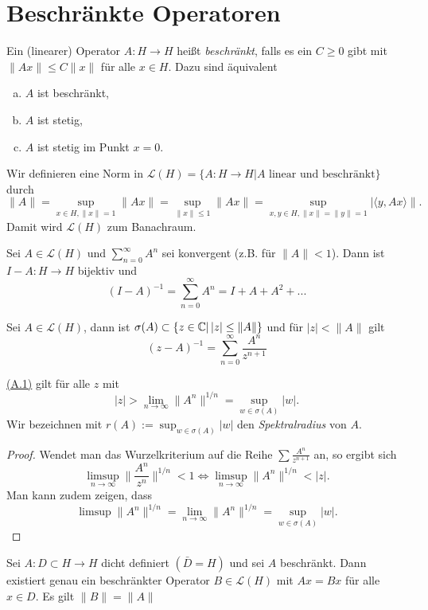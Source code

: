 \documentclass{mycourse}
\renewcommand{\eqref}[1]{\hyperref[#1]{(#1)}}
\begin{document}
\section{Beschränkte Operatoren}
Ein (linearer) Operator $A:H\to H$ heißt \emph{beschränkt}, falls es ein $C\ge 0$ gibt mit $\|Ax\| \le C\|x\|$ für alle $x\in H$. Dazu sind äquivalent
\begin{enumerate}[a)]
\item $A$ ist beschränkt,
\item $A$ ist stetig,
\item $A$ ist stetig im Punkt $x=0$.
\end{enumerate} 
Wir definieren eine Norm in $\mathcal L(H)=\{A: H\to H| A \text{ linear und beschränkt}\}$ durch
\[
\|A\|=\sup_{x\in H, \|x\|=1} \|Ax\|= \sup_{\|x\|\le 1} \|Ax\|=\sup_{x,y\in H, \|x\|=\|y\|=1} |\langle y, Ax\rangle\|.
\]
Damit wird $\mathcal L(H)$ zum Banachraum.
\begin{st}[Neumannreihe]
Sei $A\in \mathcal L(H)$ und 
$\sum_{n=0}^\infty A^n$ sei konvergent (z.B. für $\|A\|<1$). Dann ist $I-A: H\to H$ bijektiv und
\[
(I-A)^{-1}=\sum_{n=0}^\infty A^n=I+A+A^2+...
\]
\end{st}
\begin{st}
Sei $A\in \mathcal L(H)$, dann ist $\sigma(A)\subset \{z\in \mathbb{C} |\, |z|\le \|A\| \}$ und für $|z| < \|A\|$ gilt
\begin{equation}
(z-A)^{-1}=\sum_{n=0}^\infty \frac{A^n}{z^{n+1}} \label{A.1}
\end{equation}
\end{st}
\begin{nt*}
\eqref{A.1} gilt für alle $z$  mit
\[
|z| > \lim_{n\to \infty} \|A^n\|^{1/n}=\sup_{w\in \sigma(A)} |w|.
\]
Wir bezeichnen mit $r(A):= \sup_{w\in \sigma(A)} |w|$ den \emph{Spektralradius} von $A$.
\end{nt*}
\begin{proof}
Wendet man das Wurzelkriterium auf die Reihe $\sum \frac{A^n}{z^{n+1}}$ an, so ergibt sich
\[
\limsup_{n\to \infty} \big \|\frac{A^n}{z^n} \big \|^{1/n} <1 \iff \limsup_{n\to \infty} \|A^n\|^{1/n}< |z|.
\]
Man kann zudem zeigen, dass
\[
\limsup\|A^n\|^{1/n} = \lim_{n\to \infty} \|A^n\|^{1/n}=\sup_{w\in \sigma(A)} |w|.
\]
\end{proof}
\begin{st} \label{A.3}
Sei $A:D\subset H\to H$ dicht definiert $(\bar D=H)$ und sei $A$ beschränkt. Dann existiert genau ein beschränkter Operator $B\in \mathcal L(H)$ mit $Ax=Bx$ für alle $x\in D$. Es gilt $\|B\|=\|A\|$
\end{st}
\end{document}
